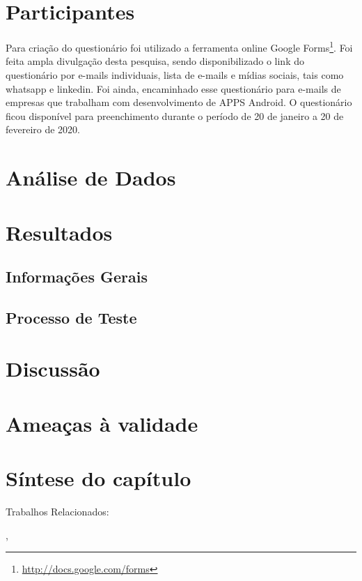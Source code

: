 \section{Participantes}

Para criação do questionário foi utilizado a ferramenta online Google Forms\footnote{\url{http://docs.google.com/forms}}. Foi feita ampla divulgação desta pesquisa, sendo disponibilizado o link do questionário por e-mails individuais, lista de e-mails e mídias sociais, tais como whatsapp e linkedin. Foi ainda, encaminhado esse questionário para e-mails de empresas que trabalham com desenvolvimento de \ac{APPS} Android. O questionário ficou disponível para preenchimento durante o período de 20 de janeiro a 20 de fevereiro de 2020.


\section{Análise de Dados}


\section{Resultados}

\subsection{Informações Gerais}

\subsection{Processo de Teste}

\section{Discussão}

\section{Ameaças à validade}

\section{Síntese do capítulo}

Trabalhos Relacionados:

\cite{7102609}, \cite{8094467}





